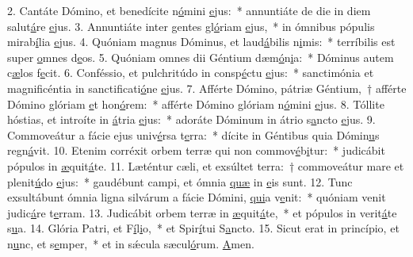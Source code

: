 2. Cantáte Dómino, et benedícite n\uline{ó}mini \uline{e}jus:~* annuntiáte de die in diem salut\uline{á}re \uline{e}jus.
3. Annuntiáte inter gentes gl\uline{ó}riam \uline{e}jus,~* in ómnibus pópulis mirab\uline{í}lia \uline{e}jus.
4. Quóniam magnus Dóminus, et laud\uline{á}bilis n\uline{i}mis:~* terríbilis est super \uline{o}mnes d\uline{e}os.
5. Quóniam omnes dii Géntium dæm\uline{ó}n\uline{i}a:~* Dóminus autem c\uline{æ}los f\uline{e}cit.
6. Conféssio, et pulchritúdo in consp\uline{é}ctu \uline{e}jus:~* sanctimónia et magnificéntia in sanctificati\uline{ó}ne \uline{e}jus.
7. Afférte Dómino, pátriæ Géntium,~† afférte Dómino glóriam \uline{e}t hon\uline{ó}rem:~* afférte Dómino glóriam n\uline{ó}mini \uline{e}jus.
8. Tóllite hóstias, et introíte in \uline{á}tria \uline{e}jus:~* adoráte Dóminum in átrio s\uline{a}ncto \uline{e}jus.
9. Commoveátur a fácie ejus univ\uline{é}rsa t\uline{e}rra:~* dícite in Géntibus quia Dómin\uline{u}s regn\uline{á}vit.
10. Etenim corréxit orbem terræ qui non commov\uline{é}b\uline{i}tur:~* judicábit pópulos in \uline{æ}quit\uline{á}te.
11. Læténtur cæli, et exsúltet terra:~† commoveátur mare et plenit\uline{ú}do \uline{e}jus:~* gaudébunt campi, et ómnia \uline{quæ} in \uline{e}is sunt.
12. Tunc exsultábunt ómnia ligna silvárum a fácie Dómini, \uline{qui}a v\uline{e}nit:~* quóniam venit judic\uline{á}re t\uline{e}rram.
13. Judicábit orbem terræ in \uline{æ}quit\uline{á}te,~* et pópulos in verit\uline{á}te s\uline{u}a.
14. Glória Patri, et F\uline{í}l\uline{i}o,~* et Spir\uline{í}tui S\uline{a}ncto.
15. Sicut erat in princípio, et n\uline{u}nc, et s\uline{e}mper,~* et in sǽcula sæcul\uline{ó}rum. \uline{A}men.
